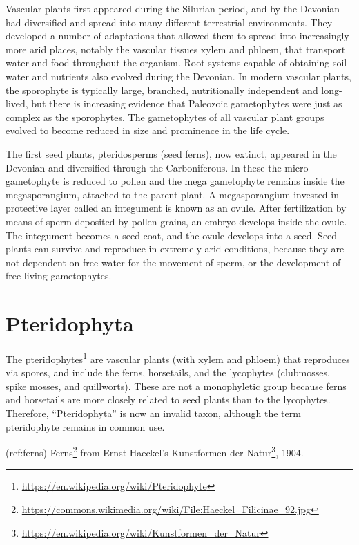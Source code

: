 \documentclass[]{book}
\let\rmarkdownfootnote\footnote%
\def\footnote{\protect\rmarkdownfootnote}
\renewcommand{\href}[2]{#2\footnote{\url{#1}}}
\theoremstyle{definition}
\theoremstyle{definition}
\theoremstyle{definition}
\theoremstyle{remark}
\begin{document}
Vascular plants first appeared during the Silurian period, and by the
Devonian had diversified and spread into many different terrestrial
environments. They developed a number of adaptations that allowed them
to spread into increasingly more arid places, notably the vascular
tissues xylem and phloem, that transport water and food throughout the
organism. Root systems capable of obtaining soil water and nutrients
also evolved during the Devonian. In modern vascular plants, the
sporophyte is typically large, branched, nutritionally independent and
long-lived, but there is increasing evidence that Paleozoic gametophytes
were just as complex as the sporophytes. The gametophytes of all
vascular plant groups evolved to become reduced in size and prominence
in the life cycle.

The first seed plants, pteridosperms (seed ferns), now extinct, appeared
in the Devonian and diversified through the Carboniferous. In these the
micro gametophyte is reduced to pollen and the mega gametophyte remains
inside the megasporangium, attached to the parent plant. A
megasporangium invested in protective layer called an integument is
known as an ovule. After fertilization by means of sperm deposited by
pollen grains, an embryo develops inside the ovule. The integument
becomes a seed coat, and the ovule develops into a seed. Seed plants can
survive and reproduce in extremely arid conditions, because they are not
dependent on free water for the movement of sperm, or the development of
free living gametophytes.

\section{Pteridophyta}\label{pteridophyta}

The \href{https://en.wikipedia.org/wiki/Pteridophyte}{pteridophytes} are
vascular plants (with xylem and phloem) that reproduces via spores, and
include the ferns, horsetails, and the lycophytes (clubmosses, spike
mosses, and quillworts). These are not a monophyletic group because
ferns and horsetails are more closely related to seed plants than to the
lycophytes. Therefore, ``Pteridophyta'' is now an invalid taxon,
although the term pteridophyte remains in common use.

(ref:ferns)
\href{https://commons.wikimedia.org/wiki/File:Haeckel_Filicinae_92.jpg}{Ferns}
from Ernst Haeckel's
\href{https://en.wikipedia.org/wiki/Kunstformen_der_Natur}{Kunstformen
der Natur}, 1904.
\end{document}

